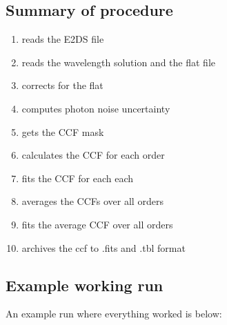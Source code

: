 \subsection{Summary of procedure}
\begin{enumerate}
\item reads the E2DS file
\item reads the wavelength solution and the flat file
\item corrects for the flat
\item computes photon noise uncertainty
\item gets the CCF mask
\item calculates the CCF for each order
\item fits the CCF for each each
\item averages the CCFs over all orders
\item fits the average CCF over all orders
\item archives the ccf to .fits and .tbl format
\end{enumerate}


\subsection{Example working run}

An example run where everything worked is below:

